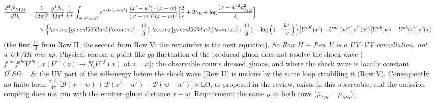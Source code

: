 {\color{red}
\begin{align}
\frac{d^{3}N_{\rm NLO}}{d^{3}k}&=\frac{1}{(2\pi)^{3}}\,\frac{g^{4}N_{c}}{32\pi^{4}}\,\frac{1}{k^{+}}\int_{w,w',x,x'}e^{-ik\cdot(w-w')}\,\frac{(x'-w')\cdot(x-w)}{(x'-w')^{2}(x-w)^{2}}\Big[\frac{2}{\epsilon}+2\gamma_{E}+\log\frac{(x-w)^{2}\mu^{2}_{\overline{MS}}}{4}\Big]\notag\\
&\qquad\times\Big\{{\color{green!50!black}\cancel{-\frac{11}{3}}}\ {\color{green!50!black}\cancel{+\frac{11}{3}}}-\log\Big(1-\frac{k^{+}}{\vee}\Big)\Big\}\big[U^{ab'}(x')-U^{ab'}(w')\big]\rho^{b'}(x')\big[U^{ab}(w)-U^{ab}(x)\big]\rho^{b}(x)\notag
\end{align}
{\color{red}(the first $\frac{11}{3}$ from Row II, the second from Row V; the remainder is the next equation). \emph{So Row II $+$ Row V is a UV--UV cancellation, not a UV/IR mix-up.} Physical reason: a point-like $gg$ fluctuation of the produced gluon does not resolve the shock wave ($f^{adc}f^{fbe}U^{db}(x)U^{ce}(z)\to N_{c}U^{af}(x)$ at $z=x$); the observable counts dressed gluons, and where the shock wave is locally constant $\Omega^{\dagger}S\Omega=S$: the UV part of the self-energy before the shock wave (Row II) is undone by the same loop straddling it (Row V). Consequently no finite term $\frac{\alpha_{s}\beta_{0}}{4\pi}\big[\mathcal{B}(x-w)+\mathcal{B}(x'-w')-\mathcal{B}(w-w')\big]\times$LO, as proposed in the review, exists in this observable, and the emission coupling does not run with the emitter--gluon distance $x-w$. Requirement: the same $\mu$ in both rows ($\bar\mu_{\overline{MS}}=\mu_{\overline{MS}}$).]}}\par\noindent
